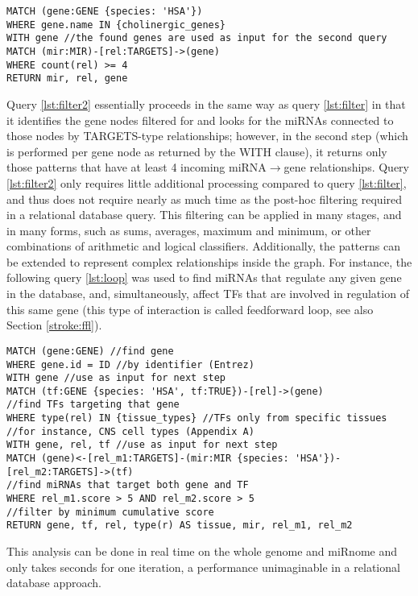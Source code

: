 \begin{lstlisting}[label=lst:filter2,caption=Two-stage Filtering,
language=Cypher]
MATCH (gene:GENE {species: 'HSA'})
WHERE gene.name IN {cholinergic_genes}
WITH gene //the found genes are used as input for the second query
MATCH (mir:MIR)-[rel:TARGETS]->(gene)
WHERE count(rel) >= 4
RETURN mir, rel, gene
\end{lstlisting}

Query \ref{lst:filter2} essentially proceeds in the same way as query \ref{lst:filter} in that it identifies the gene nodes filtered for and looks for the miRNAs connected to those nodes by TARGETS-type relationships; however, in the second step (which is performed per gene node as returned by the \textcolor{dkblue}{WITH} clause), it returns only those patterns that have at least 4 incoming miRNA$\to$gene relationships. Query \ref{lst:filter2} only requires little additional processing compared to query \ref{lst:filter}, and thus does not require nearly as much time as the post-hoc filtering required in a relational database query. This filtering can be applied in many stages, and in many forms, such as sums, averages, maximum and minimum, or other combinations of arithmetic and logical classifiers. Additionally, the patterns can be extended to represent complex relationships inside the graph. For instance, the following query \ref{lst:loop} was used to find miRNAs that regulate any given gene in the database, and, simultaneously, affect TFs that are involved in regulation of this same gene (this type of interaction is called feedforward loop, see also Section \ref{stroke:ffl}).

\begin{lstlisting}[label=lst:loop,
caption=Feedforward Loop Identification,
language=Cypher]
MATCH (gene:GENE) //find gene
WHERE gene.id = ID //by identifier (Entrez)
WITH gene //use as input for next step
MATCH (tf:GENE {species: 'HSA', tf:TRUE})-[rel]->(gene) 
//find TFs targeting that gene
WHERE type(rel) IN {tissue_types} //TFs only from specific tissues
//for instance, CNS cell types (Appendix A)
WITH gene, rel, tf //use as input for next step
MATCH (gene)<-[rel_m1:TARGETS]-(mir:MIR {species: 'HSA'})-[rel_m2:TARGETS]->(tf) 
//find miRNAs that target both gene and TF
WHERE rel_m1.score > 5 AND rel_m2.score > 5 
//filter by minimum cumulative score
RETURN gene, tf, rel, type(r) AS tissue, mir, rel_m1, rel_m2
\end{lstlisting}

This analysis can be done in real time on the whole genome and miRnome and only takes seconds for one iteration, a performance unimaginable in a relational database approach.

